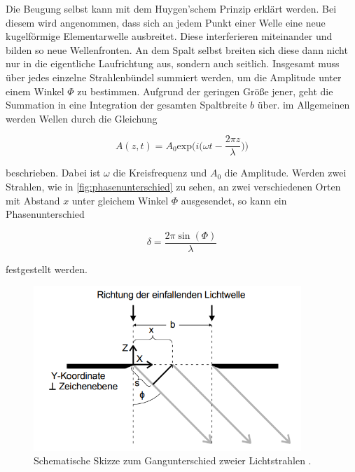 Die Beugung selbst kann mit dem Huygen'schem Prinzip erklärt werden.
Bei diesem wird angenommen, dass sich an jedem Punkt einer Welle eine neue kugelförmige Elementarwelle ausbreitet.
Diese interferieren miteinander und bilden so neue Wellenfronten.
An dem Spalt selbst breiten sich diese dann nicht nur in die eigentliche Laufrichtung aus, sondern auch seitlich.
Insgesamt muss über jedes einzelne Strahlenbündel summiert werden, um die Amplitude unter einem Winkel $\Phi$ zu bestimmen.
Aufgrund der geringen Größe jener, geht die Summation in eine Integration der gesamten Spaltbreite $b$ über.
im Allgemeinen werden Wellen durch die Gleichung

\begin{equation}
    \label{eqn:wellengleichung}
    A(z,t) = A_0 \text{exp} \bigg( i \bigg( \omega t - \frac{2\pi z}{\lambda} \bigg) \bigg)
\end{equation}

beschrieben. Dabei ist $\omega$ die Kreisfrequenz und $A_0$ die Amplitude.
Werden zwei Strahlen, wie in \autoref{fig:phasenunterschied} zu sehen, an zwei verschiedenen Orten mit Abstand $x$ unter gleichem Winkel $\Phi$ ausgesendet, so kann ein Phasenunterschied

\begin{equation}
    \label{eqn:phasenunterschied}
    \delta = \frac{2 \pi \sin (\Phi)}{\lambda}
\end{equation}

festgestellt werden.

\begin{figure}
    \centering
    \includegraphics[width=0.9\textwidth]{content/phasenunterschied.png}
    \caption{Schematische Skizze zum Gangunterschied zweier Lichtstrahlen \cite{V406}.}
    \label{fig:phasenunterschied}
\end{figure}

